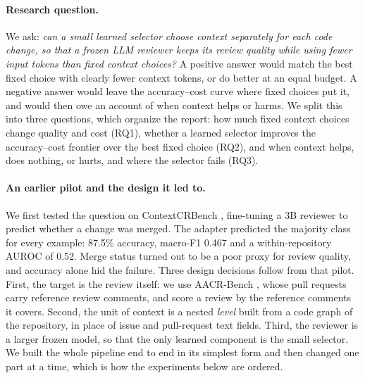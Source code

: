 \documentclass{article}
\begin{document}
\paragraph{Research question.} We ask: \emph{can a small learned selector choose context separately for each code change, so that a frozen LLM reviewer keeps its review quality while using fewer input tokens than fixed context choices?} A positive answer would match the best fixed choice with clearly fewer context tokens, or do better at an equal budget. A negative answer would leave the accuracy--cost curve where fixed choices put it, and would then owe an account of when context helps or harms. We split this into three questions, which organize the report: how much fixed context choices change quality and cost (RQ1), whether a learned selector improves the accuracy--cost frontier over the best fixed choice (RQ2), and when context helps, does nothing, or hurts, and where the selector fails (RQ3).

\paragraph{An earlier pilot and the design it led to.} We first tested the question on ContextCRBench \citep{hu2025contextcrbench}, fine-tuning a 3B reviewer to predict whether a change was merged. The adapter predicted the majority class for every example: 87.5\% accuracy, macro-F1 0.467 and a within-repository AUROC of 0.52. Merge status turned out to be a poor proxy for review quality, and accuracy alone hid the failure. Three design decisions follow from that pilot. First, the target is the review itself: we use AACR-Bench \citep{zhang2026aacr}, whose pull requests carry reference review comments, and score a review by the reference comments it covers. Second, the unit of context is a nested \emph{level} built from a code graph of the repository, in place of issue and pull-request text fields. Third, the reviewer is a larger frozen model, so that the only learned component is the small selector. We built the whole pipeline end to end in its simplest form and then changed one part at a time, which is how the experiments below are ordered.
\end{document}
